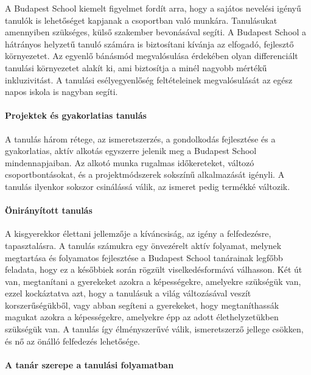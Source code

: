 A Budapest School kiemelt figyelmet fordít arra, hogy a sajátos nevelési
igényű tanulók is lehetőséget kapjanak a csoportban való munkára.
Tanulásukat amennyiben szükséges, külső szakember bevonásával segíti. A
Budapest School a hátrányos helyzetű tanuló számára is biztosítani
kívánja az elfogadó, fejlesztő környezetet. Az egyenlő bánásmód
megvalósulása érdekében olyan differenciált tanulási környezetet alakít
ki, ami biztosítja a minél nagyobb mértékű inkluzivitást. A tanulási
esélyegyenlőség feltételeinek megvalósulását az egész napos iskola is
nagyban segíti.

\paragraph{Projektek és gyakorlatias
tanulás}

A tanulás három rétege, az ismeretszerzés, a gondolkodás fejlesztése és
a gyakorlatias, aktív alkotás egyszerre jelenik meg a Budapest School
mindennapjaiban. Az alkotó munka rugalmas időkereteket, változó
csoportbontásokat, és a projektmódszerek sokszínű alkalmazását igényli.
A tanulás ilyenkor sokszor csinálássá válik, az ismeret pedig termékké
változik.

\paragraph{Önirányított
tanulás}

A kisgyerekkor élettani jellemzője a kíváncsiság, az igény a
felfedezésre, tapasztalásra. A tanulás számukra egy önvezérelt aktív
folyamat, melynek megtartása és folyamatos fejlesztése a Budapest School
tanárainak legfőbb feladata, hogy ez a későbbiek során rögzült
viselkedésformává válhasson. Két út van, megtanítani a gyerekeket azokra
a képességekre, amelyekre szükségük van, ezzel kockáztatva azt, hogy a
tanulásuk a világ változásával veszít korszerűségükből, vagy abban
segíteni a gyerekeket, hogy megtaníthassák magukat azokra a
képességekre, amelyekre épp az adott élethelyzetükben szükségük van. A
tanulás így élményszerűvé válik, ismeretszerző jellege csökken, és nő az
önálló felfedezés lehetősége.

\paragraph{A tanár szerepe a tanulási
folyamatban}

